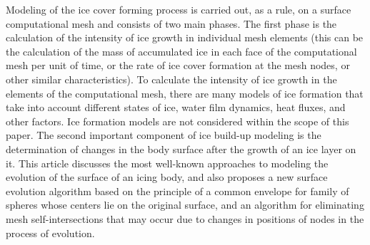 \documentclass[
11pt,%
tightenlines,%
twoside,%
onecolumn,%
nofloats,%
nobibnotes,%
nofootinbib,%
superscriptaddress,%
noshowpacs,%
centertags]%
{revtex4-2}
\begin{document}
Modeling of the ice cover forming process is carried out, as a rule, on a surface computational mesh and consists of two main phases.
The first phase is the calculation of the intensity of ice growth in individual mesh elements (this can be the calculation of the mass of accumulated ice in each face of the computational mesh per unit of time, or the rate of ice cover formation at the mesh nodes, or other similar characteristics).
To calculate the intensity of ice growth in the elements of the computational mesh, there are many models of ice formation \cite{Bartkus,Zhang,Pena} that take into account different states of ice, water film dynamics, heat fluxes, and other factors.
Ice formation models are not considered within the scope of this paper.
The second important component of ice build-up modeling is the determination of changes in the body surface after the growth of an ice layer on it.
This article discusses the most well-known approaches to modeling the evolution of the surface of an icing body, and also proposes a new surface evolution algorithm based on the principle of a common envelope for family of spheres whose centers lie on the original surface, and an algorithm for eliminating mesh self-intersections that may occur due to changes in positions of nodes in the process of evolution.
\end{document}
